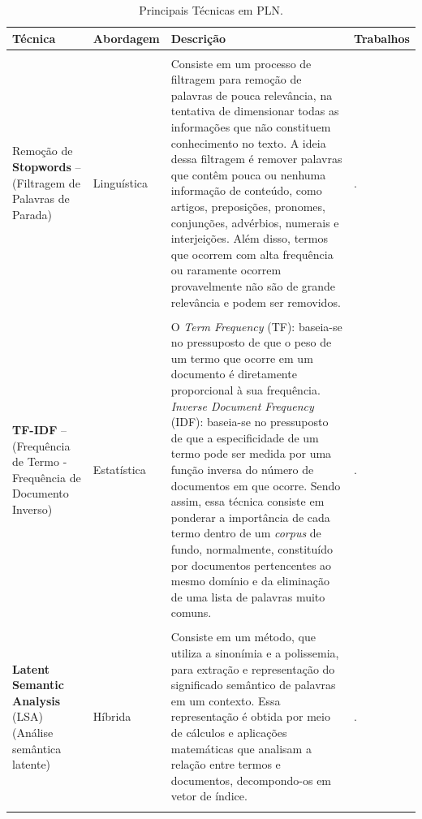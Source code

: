 \documentclass[portuguese]{textolivre}
\begin{document}
\setlength\LTleft{-1in}
\setlength\LTright{-1in}
\begin{longtable}{p{3cm}p{2cm}p{7cm}p{3.5cm}}
\caption{Principais Técnicas em PLN.}\label{tbl01}
\\
\toprule
\textbf{Técnica} & \textbf{Abordagem} & \textbf{Descrição} & \textbf{Trabalhos}\\
\hline \\
\endfirsthead
{\footnotesize Remoção de \textbf{Stopwords} – (Filtragem de Palavras de Parada)} & {\footnotesize Linguística} & {\footnotesize Consiste em um processo de filtragem para remoção de palavras de pouca relevância, na tentativa de dimensionar todas as informações que não constituem conhecimento no texto. A ideia dessa filtragem é remover palavras que contêm pouca ou nenhuma informação de conteúdo, como artigos, preposições, pronomes, conjunções, advérbios, numerais e interjeições. Além disso, termos que ocorrem com alta frequência ou raramente ocorrem provavelmente não são de grande relevância e podem ser removidos.} & {\footnotesize \textcite{luhn_automatic_1958, salton_introduction_1983, frakes_information_1992,lui_evaluation_2007, de_oliveira_junior_monitoramento_2012}}. \\
\\
{\footnotesize \textbf{TF-IDF} – (Frequência de Termo - Frequência de Documento Inverso)} & {\footnotesize Estatística} & {\footnotesize O \textit{Term Frequency} (TF): baseia-se no pressuposto de que o peso de um termo que ocorre em um documento é diretamente proporcional à sua frequência. \textit{Inverse Document Frequency} (IDF): baseia-se no pressuposto de que a especificidade de um termo pode ser medida por uma função inversa do número de documentos em que ocorre. Sendo assim, essa técnica consiste em ponderar a importância de cada termo dentro de um \textit{corpus} de fundo, normalmente, constituído por documentos pertencentes ao mesmo domínio e da eliminação de uma lista de palavras muito comuns.} & {\footnotesize \textcite{luhn_automatic_1958,jones_thesauric_1972,bhatia_literature_2015,liu_analyze_2017,rocha_pragmasum:_2017}}. \\\\

{\footnotesize \textbf{Latent Semantic Analysis} (LSA) (Análise semântica latente)} & {\footnotesize Híbrida} & {\footnotesize Consiste em um método, que utiliza a sinonímia e a polissemia, para extração e representação do significado semântico de palavras em um contexto. Essa representação é obtida por meio de cálculos e aplicações matemáticas que analisam a relação entre termos e documentos, decompondo-os em vetor de índice.} 
& {\footnotesize \textcite{landauer_introduction_1998,scarton_alise_2010}.}\\
 \\
 

\end{longtable}
\end{document}
